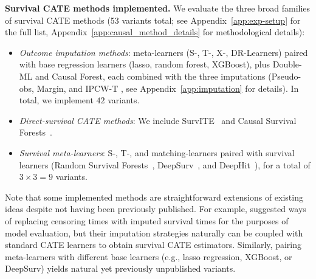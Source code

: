 \documentclass{article} %
\begin{document}
\textbf{Survival CATE methods implemented.}
We evaluate the three broad families of survival CATE methods (53 variants total; see Appendix~\ref{app:exp-setup} for the full list, Appendix~\ref{app:causal_method_details} for methodological details):
\begin{itemize} [leftmargin=*,noitemsep,topsep=-4pt,parsep=0pt]
    \item \emph{Outcome imputation methods}: meta-learners (S-, T-, X-, DR-Learners) paired with base regression learners (lasso, random forest, XGBoost), plus Double-ML and Causal Forest, each combined with the three imputations (Pseudo-obs, Margin, and IPCW-T \citep{qi2023an}, see Appendix~\ref{app:imputation} for details). In total, we implement $42$ variants.
    \item \emph{Direct-survival CATE methods}:
    We include SurvITE~\citep{curth2021survite} and Causal Survival Forests~\citep{cui2023estimating}.
    \item \emph{Survival meta-learners}:
    S-, T-, and matching-learners paired with survival learners (Random Survival Forests~\citep{ishwaran2008random}, DeepSurv~\citep{katzman2018deepsurv}, and DeepHit~\citep{lee2018deephit}), for a total of \(3\times3=9\) variants.
\end{itemize}
Note that some implemented methods are straightforward extensions of existing ideas despite not having been previously published. For example, \citep{qi2023an} suggested ways of replacing censoring times with imputed survival times for the purposes of model evaluation, but their imputation strategies naturally can be coupled with standard CATE learners to obtain survival CATE estimators. Similarly, pairing meta-learners with different base learners (e.g., lasso regression, XGBoost, or DeepSurv) yields natural yet previously unpublished variants.
\end{document}
